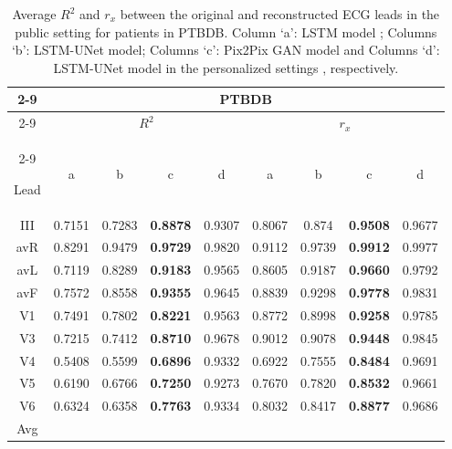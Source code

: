 

\begin{table}[t]
\begin{center}
\begin{footnotesize}
\renewcommand{\arraystretch}{1.1}
\renewcommand{\tabcolsep}{3pt}

\caption{Average $R^2$ and $r_x$ between the original and reconstructed ECG leads in the public setting for patients in PTBDB. Column `a': LSTM model \cite{lstm}; Columns `b': LSTM-UNet model; Columns `c': Pix2Pix GAN model and Columns `d': LSTM-UNet model in the personalized settings \cite{lstm-unet}, respectively.}

\begin{tabular}{|c|cccc|cccc|}
\hline
\cline{2-9}
& \multicolumn{8}{c|}{PTBDB} \\

\cline{2-9}
& \multicolumn{4}{c|}{$R^2$}
& \multicolumn{4}{c|}{$r_x$} \\
\cline{2-9}

Lead & a & b & c & d & a & b & c & d \\
\hline
III & 0.7151 & 0.7283 & \textbf{0.8878} & 0.9307 & 0.8067 & 0.874 & \textbf{0.9508} & 0.9677
  \\

avR & 0.8291 & 0.9479 & \textbf{0.9729} & 0.9820 & 0.9112 & 0.9739 & \textbf{0.9912} & 0.9977
  \\

avL & 0.7119 & 0.8289 & \textbf{0.9183} & 0.9565 & 0.8605 & 0.9187 & \textbf{0.9660} & 0.9792
  \\

avF & 0.7572 & 0.8558 & \textbf{0.9355} & 0.9645 & 0.8839 & 0.9298 & \textbf{0.9778} & 0.9831
  \\

V1 & 0.7491 & 0.7802 & \textbf{0.8221} & 0.9563 & 0.8772 & 0.8998 & \textbf{0.9258} & 0.9785
  \\

V3 & 0.7215 & 0.7412 & \textbf{0.8710} & 0.9678 & 0.9012 & 0.9078 & \textbf{0.9448} & 0.9845
  \\

V4 & 0.5408 & 0.5599 & \textbf{0.6896} & 0.9332 & 0.6922 & 0.7555 & \textbf{0.8484} & 0.9691
  \\

V5 & 0.6190 & 0.6766 & \textbf{0.7250} & 0.9273 & 0.7670 & 0.7820 & \textbf{0.8532} & 0.9661
  \\

V6 & 0.6324 & 0.6358 & \textbf{0.7763} & 0.9334 & 0.8032 & 0.8417 & \textbf{0.8877} & 0.9686
  \\

\hline

Avg &  &   &  &  &   &  &  & \\

\hline
\end{tabular}
\label{ptbdb_incart_pgg}
\end{footnotesize}

\end{center}
\end{table}